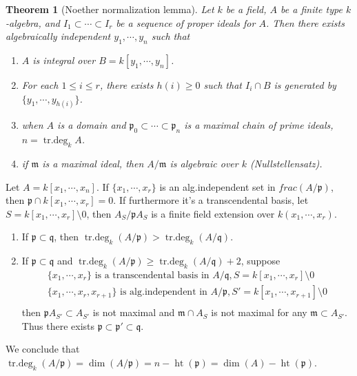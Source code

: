 \documentclass[leqno]{amsart}
\DeclareMathOperator{\hht}{ht}
\DeclareMathOperator{\trdeg}{tr.deg}
\newcommand{\1}{\mathbf{1}}
\newcommand{\fm}{\mathfrak m}
\newcommand{\fp}{\mathfrak p}
\newcommand{\fq}{\mathfrak q}
\newtheorem{thm}{Theorem}[section]
\theoremstyle{definition}
\theoremstyle{remark}
\begin{document}
\begin{thm}[Noether normalization lemma]
	Let $k$ be a field, $A$ be a finite type $k$-algebra, 
	and $I_1\subset\cdots\subset I_r$ be 
	a sequence of proper ideals for $A$.
	Then there exists algebraically independent 
	${y_1,\cdots,y_n}$ such that
	\begin{enumerate}[label=(\alph*)]
		 \item $A$ is integral over $B=k[y_1,\cdots,y_n]$.
		 \item For each $1\leq i\leq r$,
			 there exists $h(i)\geq 0$ such that 
			 $I_i\cap B$ is generated by
			  $\{ y_1, \cdots,y_{h(i)}\}$.
	\item 
	when $A$ is a domain and 
	$\fp_0\subset \cdots\subset \fp_n$ 
	is a maximal chain of prime ideals, $n=\trdeg_k A$.
	\item
	if $\fm$ is a maximal ideal, 
	then $A/\fm$ is algebraic over $k$
	(Nullstellensatz).
	\end{enumerate}
\end{thm}

Let $A=k[x_1,\cdots,x_n]$.
If $\{x_1,\cdots,x_r\}$ is an alg.independent set in 
$frac(A/\fp)$, then 
$\fp\cap k[x_1,\cdots,x_r]=0$.
If furthermore it's a transcendental basis, 
let $S=k[x_1,\cdots,x_r]\setminus 0$, then
$A_S/\fp A_S$ is a finite field extension over $k(x_1,\cdots,x_r)$.
\begin{enumerate}[label=(\alph*)]
	\item If $\fp\subset \fq$, then 
		$\trdeg_k(A/\fp)>\trdeg_k(A/\fq)$.
	\item If $\fp\subset \fq$ and
		$\trdeg_k(A/\fp)\geq \trdeg_k(A/\fq)+2$,
		suppose
		\begin{gather*}
			\{x_1,\cdots,x_r\} 
			\text{ is a transcendental basis in }
			A/\fq, S=k[x_1,\cdots,x_r]\setminus0\\
			\{x_1,\cdots,x_r,x_{r+1}\} 
			\text{ is alg.independent in }
			A/\fp, S'=k[x_1,\cdots,x_{r+1}]\setminus0\\
		\end{gather*}
		then $\fp A_{S'}\subset A_{S'}$ is not maximal
		and $\fm\cap A_S$ is not maximal for any
		$\fm\subset A_{S'}$. 
		Thus there exists $\fp\subset \fp'\subset\fq$.
\end{enumerate}
We conclude that $\trdeg_k(A/\fp)=\dim(A/\fp)=n-\hht(\fp)=\dim(A)-\hht(\fp)$.
\end{document}
